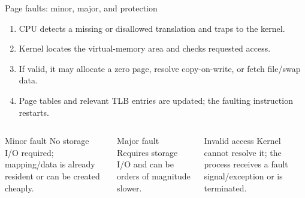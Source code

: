 \documentclass[aspectratio=169,11pt]{beamer}
\begin{document}
\begin{frame}{Page faults: minor, major, and protection}
  \begin{enumerate}
    \item CPU detects a missing or disallowed translation and traps to the kernel.
    \item Kernel locates the virtual-memory area and checks requested access.
    \item If valid, it may allocate a zero page, resolve copy-on-write, or fetch file/swap data.
    \item Page tables and relevant TLB entries are updated; the faulting instruction restarts.
  \end{enumerate}
  \begin{columns}[T,onlytextwidth]
      \begin{block}{Minor fault}
        No storage I/O required; mapping/data is already resident or can be created cheaply.
      \end{block}
      \begin{block}{Major fault}
        Requires storage I/O and can be orders of magnitude slower.
      \end{block}
      \begin{alertblock}{Invalid access}
        Kernel cannot resolve it; the process receives a fault signal/exception or is terminated.
      \end{alertblock}
  \end{columns}
\end{frame}
\end{document}
